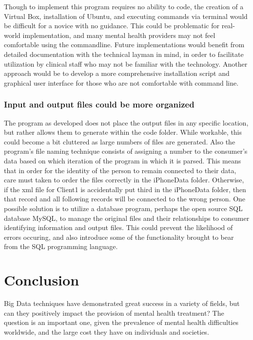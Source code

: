 \documentclass[sigconf]{acmart}
\begin{document}
Though to implement this program requires no ability to code, the creation of a Virtual Box, installation of Ubuntu, and executing commands via terminal would be difficult for a novice with no guidance. This could be problematic for real-world implementation, and many mental health providers may not feel comfortable using the commandline. Future implementations would benefit from detailed documentation with the technical layman in mind, in order to facilitate utilization by clinical staff who may not be familiar with the technology. Another approach would be to develop a more comprehensive installation script and graphical user interface for those who are not comfortable with command line.

\subsubsection{Input and output files could be more organized}

The program as developed does not place the output files in any specific location, but rather allows them to generate within the code folder. While workable, this could become a bit cluttered as large numbers of files are generated. Also the program's file naming technique consists of assigning a number to the consumer's data based on which iteration of the program in which it is parsed. This means that in order for the identity of the person to remain connected to their data, care must taken to order the files correctly in the iPhoneData folder. Otherwise, if the xml file for Client1 is accidentally put third in the iPhoneData folder, then that record and all following records will be connected to the wrong person. One possible solution is to utilize a database program, perhaps the open source SQL database MySQL, to manage the original files and their relationships to consumer identifying information and output files. This could prevent the likelihood of errors occuring, and also introduce some of the functionality brought to bear from the SQL programming language.

\section{Conclusion}

Big Data techniques have demonstrated great success in a variety of fields, but can they positively impact the provision of mental health treatment? The question is an important one, given the prevalence of mental health difficulties worldwide, and the large cost they have on individuals and societies. 
\end{document}

